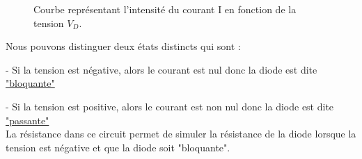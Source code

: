 \begin{figure}[H]
    \begin{center}
    \caption{\label{graph 1} Courbe représentant l'intensité du courant I en fonction de la tension $V_D$.}
    \end{center}
\end{figure}

Nous pouvons distinguer deux états distincts qui sont : 

- Si la tension est négative, alors le courant est nul donc la diode est dite \underline{"bloquante"}

- Si la tension est positive, alors le courant est non nul donc la diode est dite \underline{"passante"}\\


La résistance dans ce circuit permet de simuler la résistance de la diode lorsque la tension est négative et que la diode soit "bloquante".